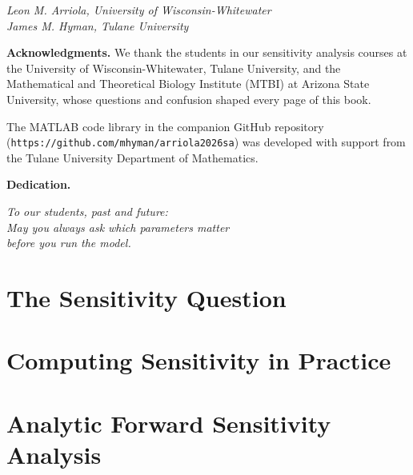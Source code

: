 \documentclass[12pt]{book}
\begin{document}
\medskip

\medskip

\noindent\textit{Leon M. Arriola, University of Wisconsin-Whitewater}\\
\noindent\textit{James M. Hyman, Tulane University}

\medskip

\noindent\textbf{Acknowledgments.}
We thank the students in our sensitivity analysis courses at the
University of Wisconsin-Whitewater, Tulane University, and the
Mathematical and Theoretical Biology Institute (MTBI) at Arizona
State University, whose questions and confusion shaped every page
of this book.

The MATLAB code library in the companion GitHub repository
(\texttt{https://github.com/mhyman/arriola2026sa}) was
developed with support from the Tulane University Department of
Mathematics.

\medskip

\noindent\textbf{Dedication.}

\medskip
\begin{center}
\textit{To our students, past and future:} \\[4pt]
\textit{May you always ask which parameters matter} \\
\textit{before you run the model.}
\end{center}

\mainmatter

\part{The Sensitivity Question}




\part{Computing Sensitivity in Practice}



\part{Analytic Forward Sensitivity Analysis}
\end{document}

